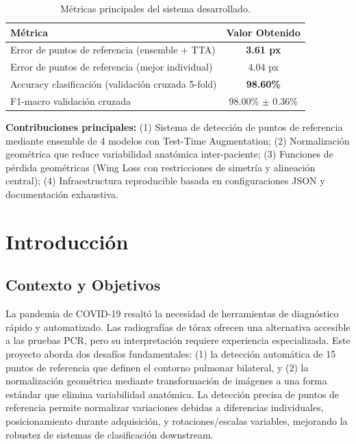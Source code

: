\documentclass[12pt,a4paper]{article}
\begin{document}
\begin{table}[H]
\centering
\begin{tabular}{lc}
\toprule
\textbf{Métrica} & \textbf{Valor Obtenido} \\
\midrule
Error de puntos de referencia (ensemble + TTA) & \textbf{3.61 px} \\
Error de puntos de referencia (mejor individual) & 4.04 px \\
Accuracy clasificación (validación cruzada 5-fold) & \textbf{98.60\%} \\
F1-macro validación cruzada & 98.00\% $\pm$ 0.36\% \\
\bottomrule
\end{tabular}
\caption{Métricas principales del sistema desarrollado.}
\end{table}

\textbf{Contribuciones principales:} (1) Sistema de detección de puntos de referencia mediante ensemble de 4 modelos con Test-Time Augmentation; (2) Normalización geométrica que reduce variabilidad anatómica inter-paciente; (3) Funciones de pérdida geométricas (Wing Loss con restricciones de simetría y alineación central); (4) Infraestructura reproducible basada en configuraciones JSON y documentación exhaustiva.

\section{Introducción}

\subsection{Contexto y Objetivos}

La pandemia de COVID-19 resaltó la necesidad de herramientas de diagnóstico rápido y automatizado. Las radiografías de tórax ofrecen una alternativa accesible a las pruebas PCR, pero su interpretación requiere experiencia especializada. Este proyecto aborda dos desafíos fundamentales: (1) la detección automática de 15 puntos de referencia que definen el contorno pulmonar bilateral, y (2) la normalización geométrica mediante transformación de imágenes a una forma estándar que elimina variabilidad anatómica. La detección precisa de puntos de referencia permite normalizar variaciones debidas a diferencias individuales, posicionamiento durante adquisición, y rotaciones/escalas variables, mejorando la robustez de sistemas de clasificación downstream.
\end{document}
